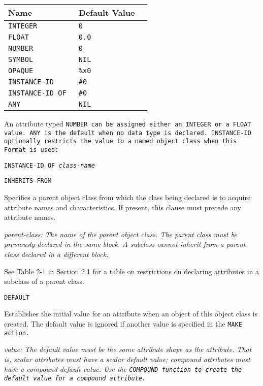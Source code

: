 {{\begin{arguments}
\begin{center}
\begin{tabular}{lll}
  \toprule
  Name & Default Value \\
  \midrule
  \tt{INTEGER} & \tt{0} \\
  \tt{FLOAT}  & \tt{0.0}\\
  \tt{NUMBER}  & \tt{0} \\
  \tt{SYMBOL}  & \tt{NIL} \\
  \tt{OPAQUE} & \verb|%x0| \\
  \tt{INSTANCE-ID} & \verb|#0| \\
  \tt{INSTANCE-ID OF} & \verb|#0| \\
  \tt{ANY}  & \tt{NIL} \\
  \bottomrule
\end{tabular}
\end{center}

An attribute typed \tt{NUMBER} can be assigned either an \tt{INTEGER}
or a \tt{FLOAT} value. \tt{ANY} is the default when no data type is
declared. \tt{INSTANCE-ID} optionally restricts the value to a
named object class when this Format is used:

\tt{INSTANCE-ID OF} \it{class-name}
\end{arguments}

\Clauses

\tt{INHERITS-FROM}

Specifies a parent object class from which the class being
declared is to acquire attribute names and characteristics.
If present, this clause must precede any attribute names.

\it{parent-class}: The name of the parent object class. The parent
class must be previously declared in the same block. A subclass cannot
inherit from a parent class declared in a different block.

See Table 2-1 in Section 2.1 for a table on restrictions on
declaring attributes in a subclass of a parent class.

\tt{DEFAULT}

Establishes the initial value for an attribute when an object of this
object class is created. The default value is ignored if another value
is specified in the \tt{MAKE} action.

\it{value}: The default value must be the same attribute shape as the
attribute. That is, scalar attributes must have a scalar default
value; compound attributes must have a compound default value. Use the
\tt{COMPOUND} function to create the default value for a compound
attribute.

}}
